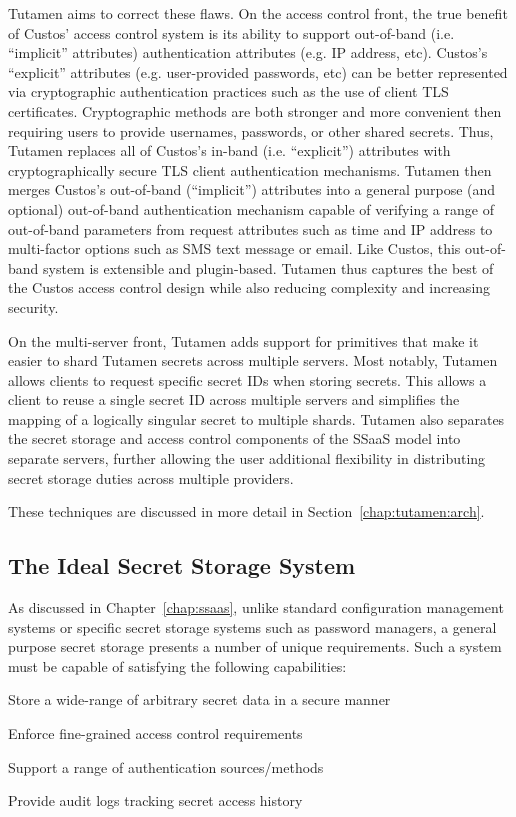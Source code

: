 Tutamen aims to correct these flaws. On the access control front, the
true benefit of Custos' access control system is its ability to
support out-of-band (i.e. ``implicit'' attributes) authentication
attributes (e.g. IP address, etc). Custos's ``explicit'' attributes
(e.g. user-provided passwords, etc) can be better represented via
cryptographic authentication practices such as the use of client TLS
certificates. Cryptographic methods are both stronger and more
convenient then requiring users to provide usernames, passwords, or
other shared secrets. Thus, Tutamen replaces all of Custos's in-band
(i.e. ``explicit'') attributes with cryptographically secure TLS
client authentication mechanisms. Tutamen then merges Custos's
out-of-band (``implicit'') attributes into a general purpose (and
optional) out-of-band authentication mechanism capable of verifying a
range of out-of-band parameters from request attributes such as time
and IP address to multi-factor options such as SMS text message or
email. Like Custos, this out-of-band system is extensible and
plugin-based. Tutamen thus captures the best of the Custos access
control design while also reducing complexity and increasing security.

On the multi-server front, Tutamen adds support for primitives that
make it easier to shard Tutamen secrets across multiple servers. Most
notably, Tutamen allows clients to request specific secret IDs when
storing secrets. This allows a client to reuse a single secret ID
across multiple servers and simplifies the mapping of a logically
singular secret to multiple shards. Tutamen also separates the secret
storage and access control components of the SSaaS model into separate
servers, further allowing the user additional flexibility in
distributing secret storage duties across multiple providers.

These techniques are discussed in more detail in
Section~\ref{chap:tutamen:arch}.

\subsection{The Ideal Secret Storage System}

As discussed in Chapter~\ref{chap:ssaas}, unlike standard
configuration management systems or specific secret storage systems
such as password managers, a general purpose secret storage presents a
number of unique requirements. Such a system must be capable of
satisfying the following capabilities:

\begin{packed_item}
\item Store a wide-range of arbitrary secret data in a secure manner
\item Enforce fine-grained access control requirements
\item Support a range of authentication sources/methods
\item Provide audit logs tracking secret access history
\end{packed_item}

